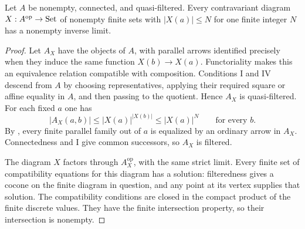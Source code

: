 \begin{proposition}
\label{CD:bounded-fibres}
Let $A$ be nonempty, connected, and quasi-filtered. Every contravariant
diagram $X:A^{\mathrm{op}}\to\mathrm{Set}$ of nonempty finite sets with
$|X(a)|\leq N$ for one finite integer $N$ has a nonempty inverse limit.
\end{proposition}
\begin{proof}
Let $A_X$ have the objects of $A$, with parallel arrows identified
precisely when they induce the same function $X(b)\to X(a)$.
Functoriality makes this an equivalence relation compatible with
composition. Conditions I and IV descend from $A$ by choosing
representatives, applying their required square or affine equality
in $A$, and then passing to the quotient. Hence $A_X$ is quasi-filtered.
For each fixed $a$ one has
\[
 |A_X(a,b)|\leq |X(a)|^{|X(b)|}\leq |X(a)|^N
 \qquad\text{for every }b.
\]
By \citet[Proposition~4.5]{IsbellMitchell1976}, every finite parallel
family out of $a$ is equalized by an ordinary arrow in $A_X$.
Connectedness and I give common successors, so $A_X$ is filtered.

The diagram $X$ factors through $A_X^{\mathrm{op}}$, with the same
strict limit. Every finite set of compatibility equations for this
diagram has a solution: filteredness gives a cocone on the finite
diagram in question, and any point at its vertex supplies that
solution. The compatibility conditions are closed in the compact
product of the finite discrete values. They have the finite
intersection property, so their intersection is nonempty.
\end{proof}

